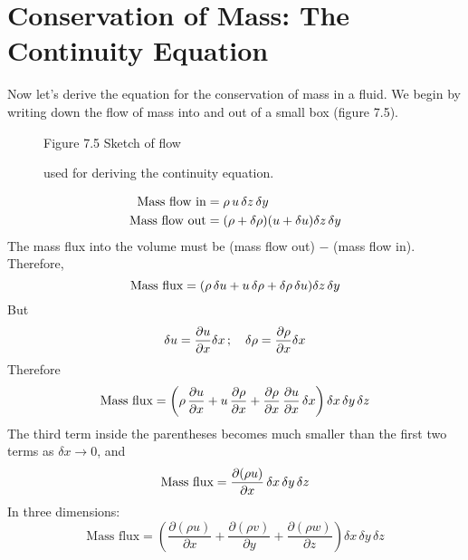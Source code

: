 \section{Conservation of Mass: The Continuity Equation}
Now let's
derive the equation for the conservation of mass in a fluid. We begin
by writing down the flow of mass into and out of a small box (figure
7.5).
\begin{figure}[h!]
\centering
\footnotesize
Figure 7.5 Sketch of flow \rule{0mm}{4ex}used for deriving the
continuity equation.
\label{fig:continuitysketchR}
\vspace{-3ex}
\end{figure}
\begin{align}
\text{Mass flow in} &= \rho \, u \, \delta z \, \delta y \notag  \\
\text{Mass flow out} &= (\rho + \delta \rho ) (u + \delta u) \delta z \,  \delta y \notag
\end{align}
The mass flux into the volume must be (mass flow out) $-$ (mass flow
in). Therefore,
\begin{equation}
\text{Mass flux} = ( \rho \, \delta u + u \, \delta \rho + \delta \rho \, \delta u)  \delta z \,  \delta y \notag
\end{equation}
But
\begin{equation}
\delta u = \frac{\partial u}{\partial x} \delta x \,;\quad \delta \rho = \frac{\partial {\rho}}{\partial x} \delta x \notag
\end{equation}
Therefore
\begin{equation}
\text{Mass flux} = \left(\rho \, \frac{\partial{u}}{\partial{x}} + u\,\frac{\partial{\rho}}{\partial{x}}
+\frac{\partial{\rho}}{\partial{x}}\,\frac{\partial{u}}{\partial{x}}\,\delta{x}\right)\delta{x}\,\delta{y}\,\delta{z}
\notag
\end{equation}
The third term inside the parentheses becomes much smaller than the
first two terms as $\delta x \rightarrow 0$, and
\begin{equation}
\text{Mass flux} =
\frac{\partial{(\rho{u})}}{\partial{x}}\,\delta{x}\,\delta{y}\,\delta{z} \notag
\end{equation}
In three dimensions:
\begin{displaymath}
\mbox{Mass flux} = \left(\frac{\partial{(\rho{u})}}{\partial{x}} +
\frac{\partial{(\rho{v})}}{\partial{y}} +
\frac{\partial{(\rho{w})}}{\partial{z}}\right)\delta{x}\,\delta{y}\,\delta{z}
\end{displaymath}
